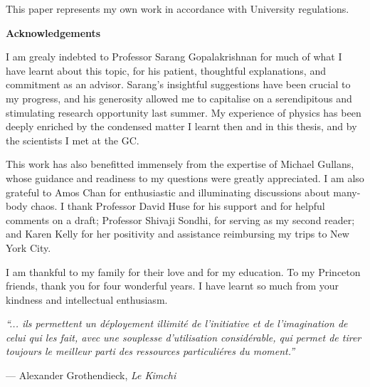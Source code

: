\documentclass[10pt]{article}
\begin{document}
\vspace{1cm}

{\centering\footnotesize
This paper represents my own work in accordance with University regulations.\\
}


\newpage

\vspace*{\fill}

{\centering
\textbf{Acknowledgements}\par
}

I am grealy indebted to Professor Sarang Gopalakrishnan for much of what I have learnt about this topic, for his patient, thoughtful explanations, and commitment as an advisor. Sarang's insightful suggestions have been crucial to my progress, and his generosity allowed me to capitalise on a serendipitous and stimulating research opportunity last summer. My experience of physics has been deeply enriched by the condensed matter I learnt then and in this thesis, and by the scientists I met at the GC. 

This work has also benefitted immensely from the expertise of Michael Gullans, whose guidance and readiness to my questions were greatly appreciated. I am also grateful to Amos Chan for enthusiastic and illuminating discussions about many-body chaos. I thank Professor David Huse for his support and for helpful comments on a draft; Professor Shivaji Sondhi, for serving as my second reader; and Karen Kelly for her positivity and assistance reimbursing my trips to New York City.

I am thankful to my family for their love and for my education. To my Princeton friends, thank you for four wonderful years. I have learnt so much from your kindness and intellectual enthusiasm. 

\vspace*{\fill}


\newpage

\vspace*{\fill}

\setlength{}

\epigraph{\itshape ``... ils permettent un d\'eployement illimit\'e de l'initiative et de l'imagination de celui qui les fait, avec une souplesse d'utilisation consid\'erable, qui permet de tirer toujours le meilleur parti des ressources particuli\'eres du moment.''}{--- Alexander Grothendieck, \textit{Le Kimchi}}

\end{document}

